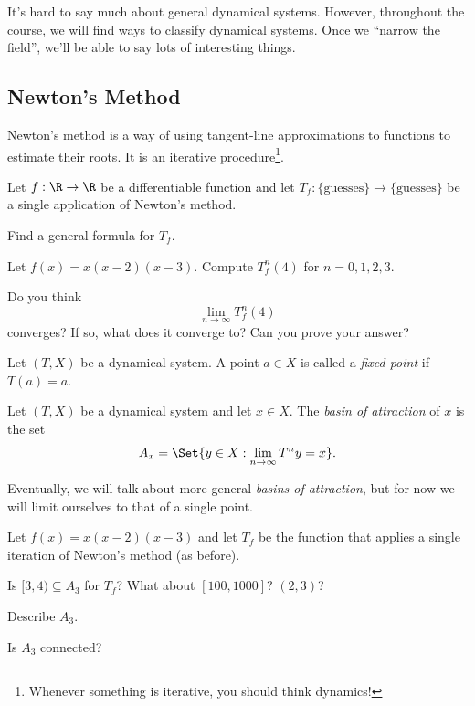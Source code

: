 	It's hard to say much about general dynamical systems.
	However, throughout the course, we will find ways to classify dynamical systems. Once we ``narrow the field'',
	we'll be able to say lots of interesting things.

	\subsection*{Newton's Method}
	Newton's method is a way of using tangent-line approximations to functions to estimate their roots.
	It is an iterative procedure\footnote{ Whenever something is iterative, you should think dynamics!}.

	\question
	Let $f:\R\to\R$ be a differentiable function and let $T_f:\{\text{guesses}\}\to\{\text{guesses}\}$ be
	a single application of Newton's method.

	\begin{parts}
		\item Find a general formula for $T_f$.
		\item Let $f(x)=x(x-2)(x-3)$. Compute $T_f^n(4)$ for $n=0,1,2,3$.
		\item Do you think
			\[
				\lim_{n\to\infty} T_f^n(4)
			\]
			converges? If so, what does it converge to? Can you prove your answer?
	\end{parts}

	\begin{definition}
		Let $(T,X)$ be a dynamical system. A point $a\in X$ is called a \emph{fixed point} if
		$T(a)=a$.
	\end{definition}

	\begin{definition}
		Let $(T,X)$ be a dynamical system and let $x\in X$. The \emph{basin of attraction}
		of $x$ is the set
		\[
			A_x=\Set{y\in X: \lim_{n\to\infty} T^ny=x}.
		\]
	\end{definition}
	Eventually, we will talk about more general \emph{basins of attraction}, but for now we will limit ourselves to
	that of a single point.

	\question
	Let $f(x)=x(x-2)(x-3)$ and let $T_f$ be the function that applies a single iteration of Newton's method (as before).
	\begin{parts}
		\item Is $[3,4)\subseteq A_3$ for $T_f$? What about $[100, 1000]$? $(2,3)$?
		\item Describe $A_3$.
		\item Is $A_3$ connected?
	\end{parts}

